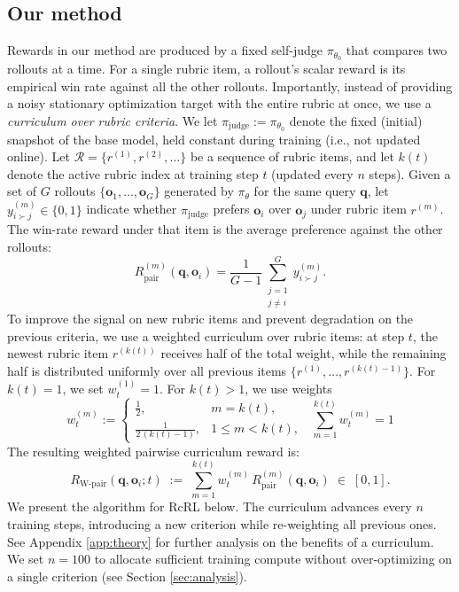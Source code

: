 \documentclass{article}
\theoremstyle{plain}
\theoremstyle{definition}
\theoremstyle{remark}
\begin{document}
\subsection{Our method}
\label{sec:ourmethod}
Rewards in our method are produced by a fixed self-judge $\pi_{\theta_0}$ that compares two rollouts at a time. For a single rubric item,
a rollout's scalar reward is its empirical win rate against all the other rollouts. Importantly, instead of providing a noisy stationary optimization target with the entire rubric at once, we use a \emph{curriculum over rubric criteria}.
We let $\pi_{\mathrm{judge}} := \pi_{\theta_0}$ denote the fixed (initial) snapshot of the base model, held constant during training (i.e., not updated online). Let $\mathcal{R}=\{r^{(1)},r^{(2)},\ldots\}$ be a sequence of rubric items, and let $k(t)$ denote the active rubric index at training step $t$ (updated every $n$ steps).
Given a set of $G$ rollouts $\{\mathbf{o}_1,\ldots,\mathbf{o}_G\}$ generated by $\pi_\theta$ for the same query $\mathbf{q}$, let $y^{(m)}_{i \succ j} \in \{0,1\}$ indicate whether $\pi_{\mathrm{judge}}$ prefers $\mathbf{o}_i$ over $\mathbf{o}_j$ under rubric item $r^{(m)}$. The win-rate reward under that item is the average preference against the other rollouts: 
\[
R^{(m)}_{\mathrm{pair}}(\mathbf{q}, \mathbf{o}_i)
=
\frac{1}{G-1}
\sum_{\substack{j=1 \\ j \neq i}}^{G}
y^{(m)}_{i \succ j}.
\]
To improve the signal on new rubric items and prevent degradation on the previous criteria, we use a weighted curriculum over rubric items: at step $t$, the newest rubric item $r^{(k(t))}$ receives half of the total weight, while the remaining half is distributed uniformly over all previous items $\{r^{(1)},\ldots,r^{(k(t)-1)}\}$. For \(k(t)=1\), we set \(w^{(1)}_t=1\). For \(k(t)>1\), we use weights
$$
w^{(m)}_t
:=
\begin{cases}
\frac{1}{2}, & m = k(t),\\[4pt]
\frac{1}{2\,(k(t)-1)}, & 1 \le m < k(t),
\end{cases}
\;\;
\textstyle\sum_{m=1}^{k(t)} w^{(m)}_t = 1
$$
The resulting weighted pairwise curriculum reward is:
$$
R_{\mathrm{W\text{-}pair}}(\mathbf{q}, \mathbf{o}_i; t)
\;:=\;
\sum_{m=1}^{k(t)} w^{(m)}_t \, R^{(m)}_{\mathrm{pair}}(\mathbf{q}, \mathbf{o}_i)
\;\in\;[0,1].
$$
We present the algorithm for RcRL below. The curriculum advances every $n$ training steps, introducing a new criterion while re-weighting all previous ones. See Appendix \ref{app:theory} for further analysis on the benefits of a curriculum. We set $n=100$ to allocate sufficient training compute without over-optimizing on a single criterion (see Section \ref{sec:analysis}).
\end{document}
